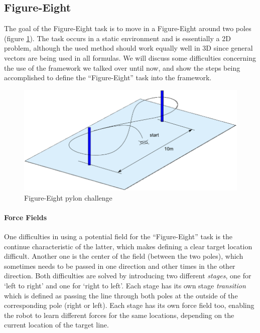 \documentclass[11pt]{article}
\begin{document}
\subsection{Figure-Eight}

The goal of the Figure-Eight task is to move in a Figure-Eight around two poles (figure \ref{fig:pylonchallenge}). The task occurs in a static environment and is essentially a 2D problem, although the used method should work equally well in 3D since general vectors are being used in all formulas. We will discuss some difficulties concerning the use of the framework we talked over until now, and show the steps being accomplished to define the ``Figure-Eight'' task into the framework.

  \begin{figure}
    \includegraphics[width=1.0\textwidth]{img/imav2011_pylon}
    \caption{Figure-Eight pylon challenge}
    \label{fig:pylonchallenge}
  \end{figure}

\paragraph{Force Fields}
One difficulties in using a potential field for the ``Figure-Eight'' task is the continue characteristic of the latter, which makes defining a clear target location difficult. Another one is the center of the field (between the two poles), which sometimes needs to be passed in one direction and other times in the other direction. Both difficulties are solved by introducing two different \emph{stages}, one for `left to right' and one for `right to left'. Each stage has its own stage \emph{transition} which is defined as passing the line through both poles at the outside of the corresponding pole (right or left). Each stage has its own force field too, enabling the robot to learn different forces for the same locations, depending on the current location of the target line.
\end{document}
